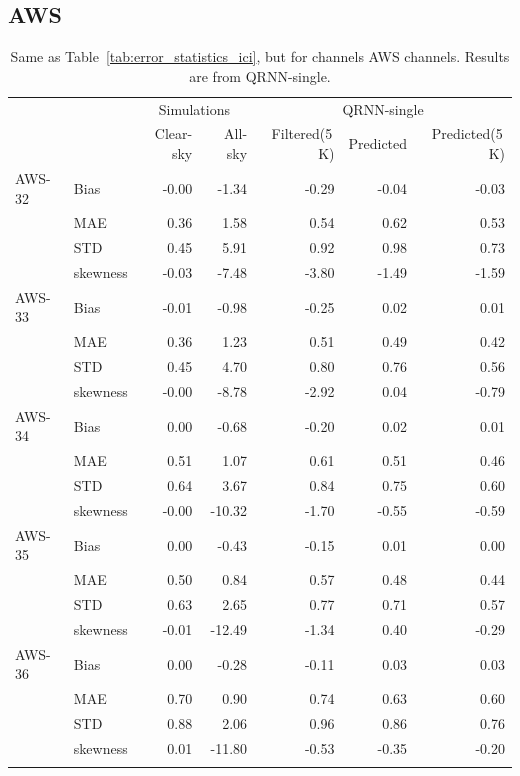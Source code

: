 \documentclass[amt, manuscript]{copernicus}
\begin{document}
\subsection{AWS}
%
\begin{table}[t]
	\caption{Same as Table~\ref{tab:error_statistics_ici}, but for channels AWS channels. Results are from QRNN-single. }
	\label{tab:statistics_qrnn_aws}
	\begin{tabular}{llrr|rrr}
		\tophline
		&&\multicolumn{2}{c|}{Simulations}& \multicolumn{3}{c}{QRNN-single} \\
		\cline{3-7}
		&&   Clear-sky &   All-sky &  Filtered(5\,K) & Predicted & Predicted(5\,K) \\
		\middlehline
		AWS-32  &Bias     & -0.00 & -1.34 & -0.29 & -0.04 & -0.03 \\
		&MAE       &  0.36 &  1.58 &  0.54 &  0.62 &  0.53 \\
		&STD      &  0.45 &  5.91 &  0.92 &  0.98 &  0.73 \\
		&skewness & -0.03 & -7.48 & -3.80 & -1.49 & -1.59 \\
		\middlehline
		AWS-33	&Bias     & -0.01 & -0.98 & -0.25 & 0.02 &  0.01 \\
		&MAE      &  0.36 &  1.23 &  0.51 & 0.49 &  0.42 \\
		&STD      &  0.45 &  4.70 &  0.80 & 0.76 &  0.56 \\
		&skewness & -0.00 & -8.78 & -2.92 & 0.04 & -0.79 \\
		
		\middlehline
		AWS-34	&Bias     &  0.00 &  -0.68 & -0.20 &  0.02 &  0.01 \\
		&MAE      &  0.51 &   1.07 &  0.61 &  0.51 &  0.46 \\
		&STD      &  0.64 &   3.67 &  0.84 &  0.75 &  0.60 \\
		&skewness & -0.00 & -10.32 & -1.70 & -0.55 & -0.59 \\
		\middlehline
		AWS-35	&Bias     &  0.00 &  -0.43 & -0.15 & 0.01 &  0.00 \\
		&MAE      &  0.50 &   0.84 &  0.57 & 0.48 &  0.44 \\
		&STD      &  0.63 &   2.65 &  0.77 & 0.71 &  0.57 \\
		&skewness & -0.01 & -12.49 & -1.34 & 0.40 & -0.29 \\
		\middlehline
		AWS-36  &Bias     & 0.00 &  -0.28 & -0.11 &  0.03 &  0.03 \\
		&MAE      & 0.70 &   0.90 &  0.74 &  0.63 &  0.60 \\
		&STD      & 0.88 &   2.06 &  0.96 &  0.86 &  0.76 \\
		&skewness & 0.01 & -11.80 & -0.53 & -0.35 & -0.20 \\
		\bottomhline				
	\end{tabular}
	\belowtable{} %
\end{table}
\end{document}
